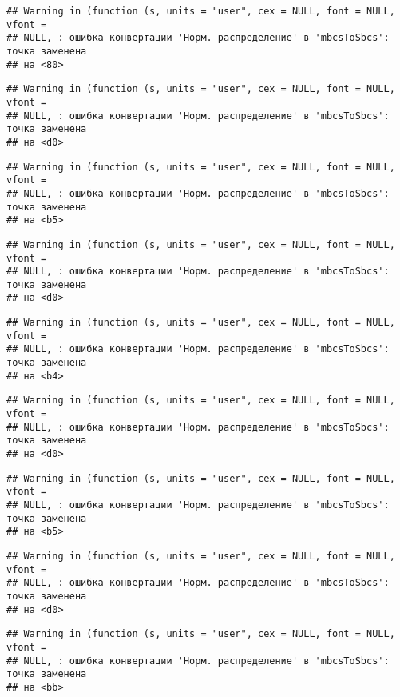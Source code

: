\documentclass[
]{article}
\begin{document}
\begin{verbatim}
## Warning in (function (s, units = "user", cex = NULL, font = NULL, vfont =
## NULL, : ошибка конвертации 'Норм. распределение' в 'mbcsToSbcs': точка заменена
## на <80>
\end{verbatim}

\begin{verbatim}
## Warning in (function (s, units = "user", cex = NULL, font = NULL, vfont =
## NULL, : ошибка конвертации 'Норм. распределение' в 'mbcsToSbcs': точка заменена
## на <d0>
\end{verbatim}

\begin{verbatim}
## Warning in (function (s, units = "user", cex = NULL, font = NULL, vfont =
## NULL, : ошибка конвертации 'Норм. распределение' в 'mbcsToSbcs': точка заменена
## на <b5>
\end{verbatim}

\begin{verbatim}
## Warning in (function (s, units = "user", cex = NULL, font = NULL, vfont =
## NULL, : ошибка конвертации 'Норм. распределение' в 'mbcsToSbcs': точка заменена
## на <d0>
\end{verbatim}

\begin{verbatim}
## Warning in (function (s, units = "user", cex = NULL, font = NULL, vfont =
## NULL, : ошибка конвертации 'Норм. распределение' в 'mbcsToSbcs': точка заменена
## на <b4>
\end{verbatim}

\begin{verbatim}
## Warning in (function (s, units = "user", cex = NULL, font = NULL, vfont =
## NULL, : ошибка конвертации 'Норм. распределение' в 'mbcsToSbcs': точка заменена
## на <d0>
\end{verbatim}

\begin{verbatim}
## Warning in (function (s, units = "user", cex = NULL, font = NULL, vfont =
## NULL, : ошибка конвертации 'Норм. распределение' в 'mbcsToSbcs': точка заменена
## на <b5>
\end{verbatim}

\begin{verbatim}
## Warning in (function (s, units = "user", cex = NULL, font = NULL, vfont =
## NULL, : ошибка конвертации 'Норм. распределение' в 'mbcsToSbcs': точка заменена
## на <d0>
\end{verbatim}

\begin{verbatim}
## Warning in (function (s, units = "user", cex = NULL, font = NULL, vfont =
## NULL, : ошибка конвертации 'Норм. распределение' в 'mbcsToSbcs': точка заменена
## на <bb>
\end{verbatim}
\end{document}
